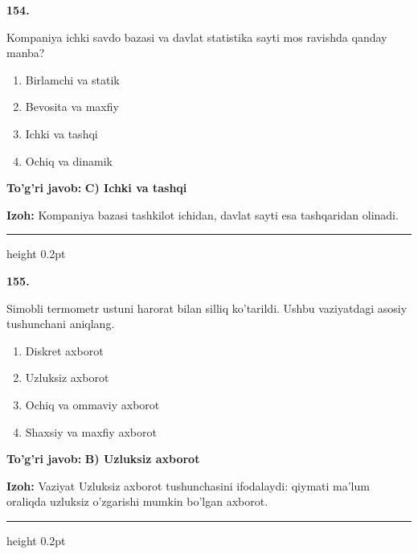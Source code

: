 \documentclass[10pt,a4paper,oneside]{article}
\begin{document}
\noindent\textbf{\color{ink}154.}
\par
Kompaniya ichki savdo bazasi va davlat statistika sayti mos ravishda qanday manba?
\begin{enumerate}[label=\Alph*),leftmargin=9mm]
\item Birlamchi va statik
\item Bevosita va maxfiy
\item Ichki va tashqi
\item Ochiq va dinamik
\end{enumerate}
\begin{tcolorbox}[enhanced,breakable,colback=teal!4,colframe=teal!50!black,boxrule=0.5pt,arc=1.1mm,left=3mm,right=3mm,top=1.7mm,bottom=1.7mm,before skip=2mm,after skip=2mm]
\textbf{\color{teal}To'g'ri javob:} \textbf{C) Ichki va tashqi}
\par\smallskip
\textbf{Izoh:} Kompaniya bazasi tashkilot ichidan, davlat sayti esa tashqaridan olinadi.
\end{tcolorbox}
\vspace{2mm}\hrule height 0.2pt \vspace{3mm}

\noindent\textbf{\color{ink}155.}
\par
Simobli termometr ustuni harorat bilan silliq ko'tarildi. Ushbu vaziyatdagi asosiy tushunchani aniqlang.
\begin{enumerate}[label=\Alph*),leftmargin=9mm]
\item Diskret axborot
\item Uzluksiz axborot
\item Ochiq va ommaviy axborot
\item Shaxsiy va maxfiy axborot
\end{enumerate}
\begin{tcolorbox}[enhanced,breakable,colback=teal!4,colframe=teal!50!black,boxrule=0.5pt,arc=1.1mm,left=3mm,right=3mm,top=1.7mm,bottom=1.7mm,before skip=2mm,after skip=2mm]
\textbf{\color{teal}To'g'ri javob:} \textbf{B) Uzluksiz axborot}
\par\smallskip
\textbf{Izoh:} Vaziyat Uzluksiz axborot tushunchasini ifodalaydi: qiymati ma'lum oraliqda uzluksiz o'zgarishi mumkin bo'lgan axborot.
\end{tcolorbox}
\vspace{2mm}\hrule height 0.2pt \vspace{3mm}
\end{document}
